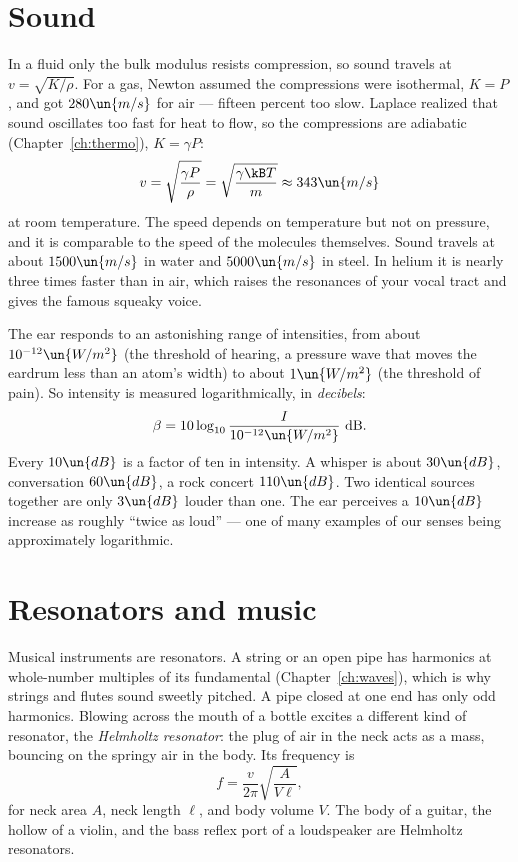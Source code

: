 \section{Sound}

In a fluid only the bulk modulus resists compression, so sound travels at $v = \sqrt{K/\rho}$. For a gas, Newton assumed the compressions were isothermal, $K = P$, and got $280\un{m/s}$ for air --- fifteen percent too slow. Laplace realized that sound oscillates too fast for heat to flow, so the compressions are adiabatic (Chapter~\ref{ch:thermo}), $K = \gamma P$:
\[
  v = \sqrt{\frac{\gamma P}{\rho}} = \sqrt{\frac{\gamma\kB T}{m}} \approx 343\un{m/s}
\]
at room temperature. The speed depends on temperature but not on pressure, and it is comparable to the speed of the molecules themselves. Sound travels at about $1500\un{m/s}$ in water and $5000\un{m/s}$ in steel. In helium it is nearly three times faster than in air, which raises the resonances of your vocal tract and gives the famous squeaky voice.

The ear responds to an astonishing range of intensities, from about $10^{-12}\un{W/m^2}$ (the threshold of hearing, a pressure wave that moves the eardrum less than an atom's width) to about $1\un{W/m^2}$ (the threshold of pain). So intensity is measured logarithmically, in \emph{decibels}:
\[
  \beta = 10\log_{10}\frac{I}{10^{-12}\un{W/m^2}}\ \text{dB}.
\]
Every $10\un{dB}$ is a factor of ten in intensity. A whisper is about $30\un{dB}$, conversation $60\un{dB}$, a rock concert $110\un{dB}$. Two identical sources together are only $3\un{dB}$ louder than one. The ear perceives a $10\un{dB}$ increase as roughly ``twice as loud'' --- one of many examples of our senses being approximately logarithmic.

\section{Resonators and music}

Musical instruments are resonators. A string or an open pipe has harmonics at whole-number multiples of its fundamental (Chapter~\ref{ch:waves}), which is why strings and flutes sound sweetly pitched. A pipe closed at one end has only odd harmonics. Blowing across the mouth of a bottle excites a different kind of resonator, the \emph{Helmholtz resonator}: the plug of air in the neck acts as a mass, bouncing on the springy air in the body. Its frequency is
\[
  f = \frac{v}{2\pi}\sqrt{\frac{A}{V\ell}},
\]
for neck area $A$, neck length $\ell$, and body volume $V$. The body of a guitar, the hollow of a violin, and the bass reflex port of a loudspeaker are Helmholtz resonators.

